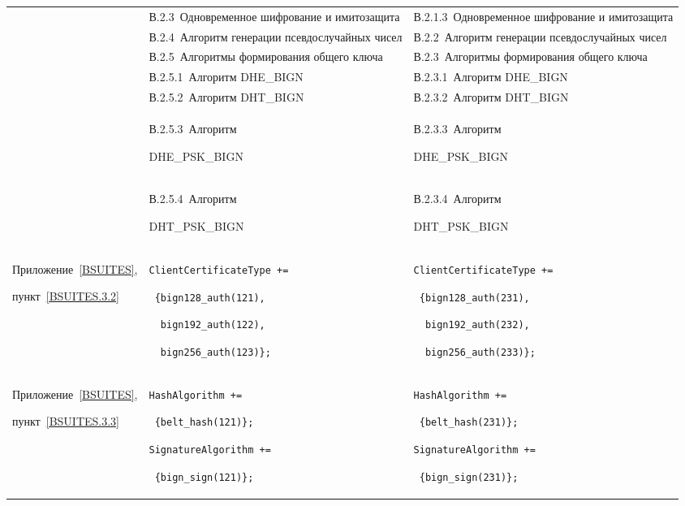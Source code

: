 \begin{center}
\begin{tabular}{|p{3.5cm}|p{6cm}|p{6cm}|}
\hline
{}
&
В.2.3~Одновременное шифрование и имитозащита
&
В.2.1.3~Одновременное шифрование и имитозащита
\\
&
В.2.4~Алгоритм генерации псевдослучайных чисел
&
В.2.2~Алгоритм генерации псевдослучайных чисел
\\
&
В.2.5~Алгоритмы формирования общего ключа
&
В.2.3~Алгоритмы формирования общего ключа
\\
&
В.2.5.1~Алгоритм DHE\_BIGN
&
В.2.3.1~Алгоритм DHE\_BIGN
\\
&
В.2.5.2~Алгоритм DHT\_BIGN
&
В.2.3.2~Алгоритм DHT\_BIGN
\\
&
В.2.5.3~Алгоритм\par DHE\_PSK\_BIGN
&
В.2.3.3~Алгоритм\par DHE\_PSK\_BIGN
\\
&
В.2.5.4~Алгоритм\par DHT\_PSK\_BIGN
&
В.2.3.4~Алгоритм\par DHT\_PSK\_BIGN
\\
\hline
Приложение~\ref{BSUITES},\par
пункт~\ref{BSUITES.3.2} 
&
\lstinline|ClientCertificateType +=|\par
\lstinline| {bign128_auth(121),|\par
\lstinline|  bign192_auth(122),|\par
\lstinline|  bign256_auth(123)};|
&
\lstinline|ClientCertificateType +=|\par
\lstinline| {bign128_auth(231),|\par
\lstinline|  bign192_auth(232),|\par
\lstinline|  bign256_auth(233)};|
\\
\hline
Приложение~\ref{BSUITES},\par
пункт~\ref{BSUITES.3.3} 
&
\lstinline|HashAlgorithm +=|\par
\lstinline| {belt_hash(121)};|\par
\lstinline|SignatureAlgorithm +=|\par
\lstinline| {bign_sign(121)};|
&
\lstinline|HashAlgorithm +=|\par
\lstinline| {belt_hash(231)};|\par
\lstinline|SignatureAlgorithm +=|\par
\lstinline| {bign_sign(231)};|
\\
\hline
\end{tabular}
\end{center}